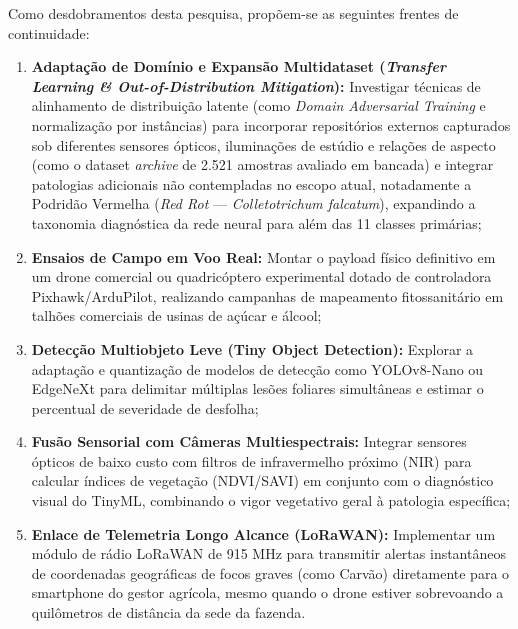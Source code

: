 Como desdobramentos desta pesquisa, propõem-se as seguintes frentes de continuidade:
\begin{enumerate}
    \item \textbf{Adaptação de Domínio e Expansão Multidataset (\textit{Transfer Learning \& Out-of-Distribution Mitigation}):} Investigar técnicas de alinhamento de distribuição latente (como \textit{Domain Adversarial Training} e normalização por instâncias) para incorporar repositórios externos capturados sob diferentes sensores ópticos, iluminações de estúdio e relações de aspecto (como o dataset \textit{archive} de 2.521 amostras avaliado em bancada) e integrar patologias adicionais não contempladas no escopo atual, notadamente a Podridão Vermelha (\textit{Red Rot} — \textit{Colletotrichum falcatum}), expandindo a taxonomia diagnóstica da rede neural para além das 11 classes primárias;
    \item \textbf{Ensaios de Campo em Voo Real:} Montar o payload físico definitivo em um drone comercial ou quadricóptero experimental dotado de controladora Pixhawk/ArduPilot, realizando campanhas de mapeamento fitossanitário em talhões comerciais de usinas de açúcar e álcool;
    \item \textbf{Detecção Multiobjeto Leve (Tiny Object Detection):} Explorar a adaptação e quantização de modelos de detecção como YOLOv8-Nano ou EdgeNeXt para delimitar múltiplas lesões foliares simultâneas e estimar o percentual de severidade de desfolha;
    \item \textbf{Fusão Sensorial com Câmeras Multiespectrais:} Integrar sensores ópticos de baixo custo com filtros de infravermelho próximo (NIR) para calcular índices de vegetação (NDVI/SAVI) em conjunto com o diagnóstico visual do TinyML, combinando o vigor vegetativo geral à patologia específica;
    \item \textbf{Enlace de Telemetria Longo Alcance (LoRaWAN):} Implementar um módulo de rádio LoRaWAN de 915 MHz para transmitir alertas instantâneos de coordenadas geográficas de focos graves (como Carvão) diretamente para o smartphone do gestor agrícola, mesmo quando o drone estiver sobrevoando a quilômetros de distância da sede da fazenda.
\end{enumerate}
